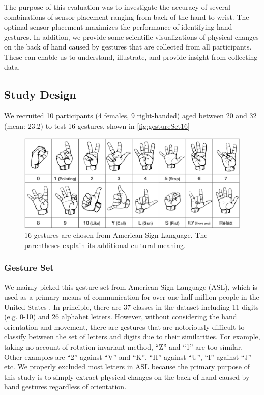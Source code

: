 \documentclass{sigchi}
\begin{document}
The purpose of this evaluation was to investigate the accuracy of several combinations of sensor placement ranging from back of the hand to wrist. 
The optimal sensor placement maximizes the performance of identifying hand gestures. %
In addition, we provide some scientific visualizations of physical changes on the back of hand caused by gestures that are collected from all participants. These can enable us to understand, illustrate, and provide insight from collecting data. %

\subsection{Study Design}
We recruited 10 participants (4 females, 9 right-handed) aged between 20 and 32 (mean: 23.2) to test 16 gestures, shown in \autoref{fig:gestureSet16}

\begin{figure}
  \begin{center}
  \includegraphics[width=1\columnwidth]{figures/gestureSet_16_v3.pdf}
  \caption{16 gestures are chosen from American Sign Language. The parentheses explain its additional cultural meaning.}
  \label{fig:gestureSet16}
  \end{center}
\end{figure}

\subsubsection{Gesture Set}

We mainly picked this gesture set from American Sign Language (ASL), which is used as a primary means of communication for over one half million people in the United States \cite{How_Many_People_Use_ASL}. 
In principle, there are 37 classes in the dataset including 11 digits (e.g. 0-10) and 26 alphabet letters. However, without considering the hand orientation and movement, there are gestures that are notoriously difficult to classify between the set of letters and digits due to their similarities.
For example, taking no account of rotation invariant method, ``Z'' and ``1'' are too similar.
Other examples are ``2'' against ``V'' and ``K'', ``H'' against ``U'', ``I'' against ``J'' etc.
We properly excluded most letters in ASL because the primary purpose of this study is to simply extract physical changes on the back of hand caused by hand gestures regardless of orientation.
\end{document}
